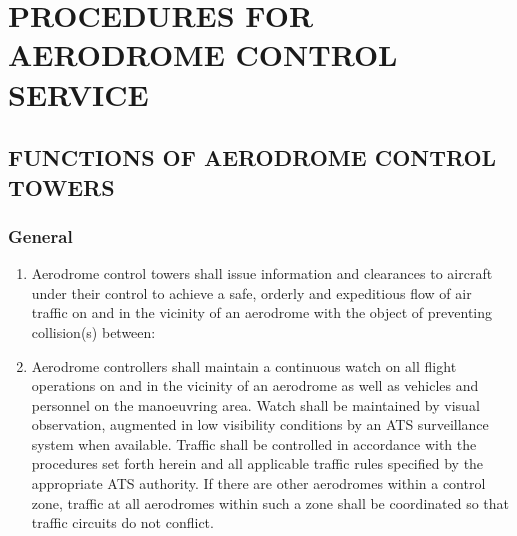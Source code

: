 \chapterbegin

\section[Procedures for Aerodrome Control Service]{PROCEDURES FOR AERODROME CONTROL SERVICE}

\subsection[Functions of aerodrome control towers]{FUNCTIONS OF AERODROME CONTROL TOWERS}

\subsubsection{General}

\begin{enumerate}
    \item Aerodrome control towers shall issue information and clearances to aircraft under their control to achieve a safe, orderly and expeditious flow of air traffic on and in the vicinity of an aerodrome with the object of preventing collision(s) between:


    \item Aerodrome controllers shall maintain a continuous watch on all flight operations on and in the vicinity of an aerodrome as well as vehicles and personnel on the manoeuvring area. Watch shall be maintained by visual observation, augmented in low visibility conditions by an ATS surveillance system when available. Traffic shall be controlled in accordance with the procedures set forth herein and all applicable traffic rules specified by the appropriate ATS authority. If there are other aerodromes within a control zone, traffic at all aerodromes within such a zone shall be coordinated so that traffic circuits do not conflict.


\end{enumerate}
